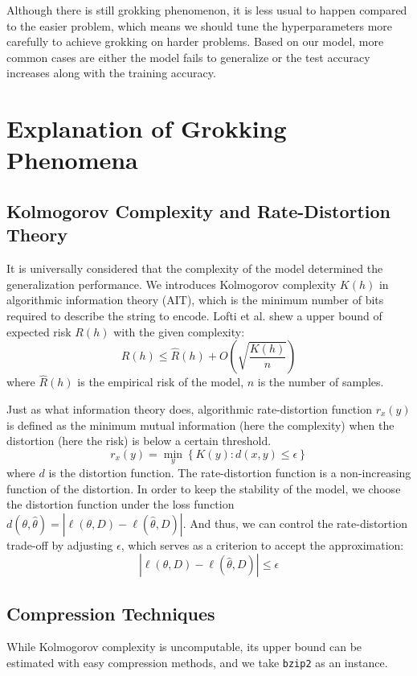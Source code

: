 \documentclass{article}
\begin{document}
Although there is still grokking phenomenon, it is less usual to happen compared to the easier problem, which means we should tune the hyperparameters more carefully to achieve grokking on harder problems. Based on our model, more common cases are either the model fails to generalize or the test accuracy increases along with the training accuracy.

\section{Explanation of Grokking Phenomena}

\subsection{Kolmogorov Complexity and Rate-Distortion Theory}

It is universally considered that the complexity of the model determined the generalization performance. We introduces Kolmogorov complexity $K(h)$ in algorithmic information theory (AIT), which is the minimum number of bits required to describe the string to encode. Lofti et al. shew a upper bound of expected risk $R(h)$ with the given complexity:
$$
R(h) \leq \hat{R}(h) + O\left(\sqrt{\frac{K(h)}{n}}\right)
$$
where $\hat{R}(h)$ is the empirical risk of the model, $n$ is the number of samples. 

Just as what information theory does, algorithmic rate-distortion function $r_x(y)$ is defined as the minimum mutual information (here the complexity) when the distortion (here the risk) is below a certain threshold. 
$$
r_x(y) = \min_y\left\{ K(y): d(x, y) \le \epsilon \right\}
$$
where $d$ is the distortion function. The rate-distortion function is a non-increasing function of the distortion. In order to keep the stability of the model, we choose the distortion function under the loss function $d(\theta, \hat{\theta}) = | \ell(\theta, D) - \ell(\hat{\theta}, D) |$. And thus, we can control the rate-distortion trade-off by adjusting $\epsilon$, which serves as a criterion to accept the approximation:
$$
\left| \ell(\theta, D) - \ell(\hat{\theta}, D) \right| \le \epsilon
$$

\subsection{Compression Techniques}

While Kolmogorov complexity is uncomputable, its upper bound can be estimated with easy compression methods, and we take \texttt{bzip2} as an instance. 
\end{document}
